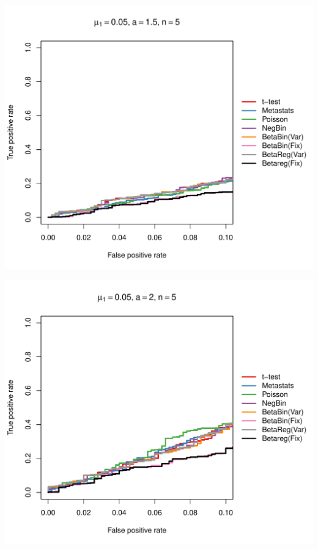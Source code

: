 \documentclass[12pt]{article}\usepackage{graphicx, color}
\makeatletter
\def\maxwidth{ %
  \ifdim\Gin@nat@width>\linewidth
    \linewidth
  \else
    \Gin@nat@width
  \fi
}
\newenvironment{knitrout}{}{} %
\makeatother
\begin{document}
\begin{knitrout}
{\centering \includegraphics[width=\maxwidth]{figure/rocs43} 

}




{\centering \includegraphics[width=\maxwidth]{figure/rocs44} 

}





\end{knitrout}
\end{document}
